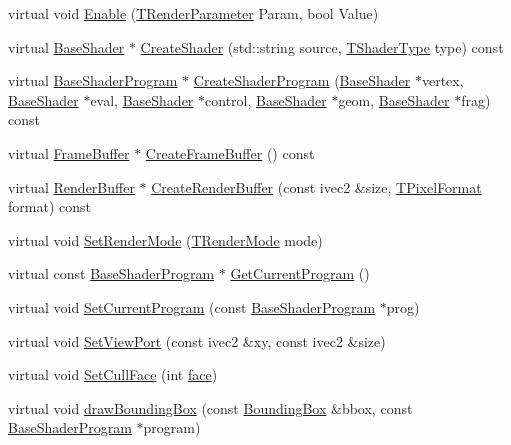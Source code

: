 \begin{DoxyCompactItemize}
\item 
virtual void \hyperlink{class_agmd_1_1_g_l_driver_a0f7dc8a8dd0a35f456abf04748d674ba}{Enable} (\hyperlink{namespace_agmd_afc630cffacc9bfc42e46816feb4744ae}{T\+Render\+Parameter} Param, bool Value)
\item 
virtual \hyperlink{class_agmd_1_1_base_shader}{Base\+Shader} $\ast$ \hyperlink{class_agmd_1_1_g_l_driver_ab2e9dad9e27f72a8e45313b4cdd757e9}{Create\+Shader} (std\+::string source, \hyperlink{namespace_agmd_a162a493eaff1589f07a505806e6724b4}{T\+Shader\+Type} type) const 
\item 
virtual \hyperlink{class_agmd_1_1_base_shader_program}{Base\+Shader\+Program} $\ast$ \hyperlink{class_agmd_1_1_g_l_driver_a06554eb69eba097702bdef7f64a6cb9a}{Create\+Shader\+Program} (\hyperlink{class_agmd_1_1_base_shader}{Base\+Shader} $\ast$vertex, \hyperlink{class_agmd_1_1_base_shader}{Base\+Shader} $\ast$eval, \hyperlink{class_agmd_1_1_base_shader}{Base\+Shader} $\ast$control, \hyperlink{class_agmd_1_1_base_shader}{Base\+Shader} $\ast$geom, \hyperlink{class_agmd_1_1_base_shader}{Base\+Shader} $\ast$frag) const 
\item 
virtual \hyperlink{class_agmd_1_1_frame_buffer}{Frame\+Buffer} $\ast$ \hyperlink{class_agmd_1_1_g_l_driver_af7da1b0074515ed7aa2b9837bf2c1319}{Create\+Frame\+Buffer} () const 
\item 
virtual \hyperlink{class_agmd_1_1_render_buffer}{Render\+Buffer} $\ast$ \hyperlink{class_agmd_1_1_g_l_driver_a09cb3cec6ed1df5ff40e5fc67cb8d222}{Create\+Render\+Buffer} (const ivec2 \&size, \hyperlink{namespace_agmd_afc48fd9fa5dccb4c5621c052bfd1a7ec}{T\+Pixel\+Format} format) const 
\item 
virtual void \hyperlink{class_agmd_1_1_g_l_driver_a4b7766cf2ffe53b71a6de1a76b8272de}{Set\+Render\+Mode} (\hyperlink{namespace_agmd_aa4cbd15e55e815e187c31a8f435addae}{T\+Render\+Mode} mode)
\item 
virtual const \hyperlink{class_agmd_1_1_base_shader_program}{Base\+Shader\+Program} $\ast$ \hyperlink{class_agmd_1_1_g_l_driver_a103a7d4d5a67c924c3e25a494cdb19d6}{Get\+Current\+Program} ()
\item 
virtual void \hyperlink{class_agmd_1_1_g_l_driver_a034ddd338f3f7e312d3844ba50e03a35}{Set\+Current\+Program} (const \hyperlink{class_agmd_1_1_base_shader_program}{Base\+Shader\+Program} $\ast$prog)
\item 
virtual void \hyperlink{class_agmd_1_1_g_l_driver_a8c86b2ef5e0ca9178e9ff16ee432a624}{Set\+View\+Port} (const ivec2 \&xy, const ivec2 \&size)
\item 
virtual void \hyperlink{class_agmd_1_1_g_l_driver_aeeb0c06849491a9fa62b46a8624d1734}{Set\+Cull\+Face} (int \hyperlink{_planet_8cpp_ae1161f79bdbe47164b23549af2139d25}{face})
\item 
virtual void \hyperlink{class_agmd_1_1_g_l_driver_ac182595e214c160ab8554c84f6d2da75}{draw\+Bounding\+Box} (const \hyperlink{class_agmd_1_1_bounding_box}{Bounding\+Box} \&bbox, const \hyperlink{class_agmd_1_1_base_shader_program}{Base\+Shader\+Program} $\ast$program)
\end{DoxyCompactItemize}
